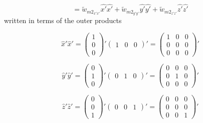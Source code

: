 \documentclass[12pt]{article}
\begin{document}
\begin{equation}{=\widetilde{w}_{{m2}_{x'x'}}\hat{x'}\hat{x'}+\widetilde{w}_{{m2}_{y'y'}}\hat{y'}\hat{y'}+\widetilde{w}_{{m2}_{z'z'}}\hat{z'}\hat{z'}}\end{equation}
written in terms of the outer products

\begin{displaymath}{\hat{x}'\hat{x}'= \left(\begin{array}{c} 1 \\ 0 \\ 0 \end{array}\right)'\left(\begin{array}{ccc} 1 & 0 & 0 \end{array}\right)'=\left(\begin{array}{ccc} 1 & 0 & 0 \\ 0 & 0 & 0 \\ 0 & 0 & 0 \end{array}\right)'}\end{displaymath}

\begin{displaymath}{\hat{y}'\hat{y}'= \left(\begin{array}{c} 0 \\ 1 \\ 0 \end{array}\right)'\left(\begin{array}{ccc} 0 & 1 & 0 \end{array}\right)'=\left(\begin{array}{ccc} 0 & 0 & 0 \\ 0 & 1 & 0 \\ 0 & 0 & 0 \end{array}\right)'}\end{displaymath}

\begin{displaymath}{\hat{z}'\hat{z}'= \left(\begin{array}{c} 0 \\ 0 \\ 1 \end{array}\right)'\left(\begin{array}{ccc} 0 & 0 & 1 \end{array}\right)'=\left(\begin{array}{ccc} 0 & 0 & 0 \\ 0 & 0 & 0 \\ 0 & 0 & 1 \end{array}\right)'}\end{displaymath}
\end{document}
